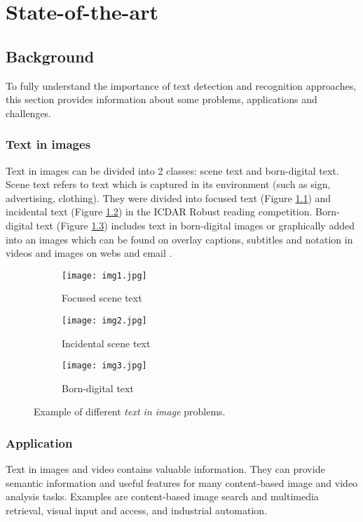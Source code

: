 
\graphicspath{ {2chapterStateOfArt/image/} }
\chapter{State-of-the-art} \label{State-of-Art}
\section{Background}

To fully understand the importance of text detection and recognition approaches, this section provides information about some problems, applications and challenges.
\subsection{Text in images}
Text in images can be divided into 2 classes: scene text and  born-digital text. Scene text refers to text which is captured in its environment (such as sign, advertising, clothing). They were divided into focused text (Figure \ref{fig:focused}) and incidental text (Figure \ref{fig:incidental}) in the ICDAR Robust reading competition. Born-digital text (Figure \ref{fig:bornDigital}) includes text in born-digital images or graphically added into an images which can be found on overlay captions, subtitles and notation in videos and images on webs and email \cite{Karatzas.2011.ICDAR}.


\begin{figure}

	\begin{subfigure}[b]{0.3\textwidth}
	 	\texttt{[image: img1.jpg]} \caption{Focused scene text}\label{fig:focused} \end{subfigure}
	\begin{subfigure}[b]{0.3\textwidth}
		\texttt{[image: img2.jpg]} \caption{Incidental scene text}\label{fig:incidental} \end{subfigure}
	\begin{subfigure}[b]{0.3\textwidth}
		\texttt{[image: img3.jpg]} \caption{Born-digital text}\label{fig:bornDigital} \end{subfigure}
	\centering
	\caption[Example of different \textit{text in image} problems] {Example of different \textit{text in image} problems.}
	\label{fig:example}
\end{figure}

\subsection{Application}
\par
Text in images and video contains valuable information. They can provide semantic information and useful features for many content-based image and video analysis tasks. Examples are content-based image search and multimedia retrieval, visual input and access, and industrial automation.

